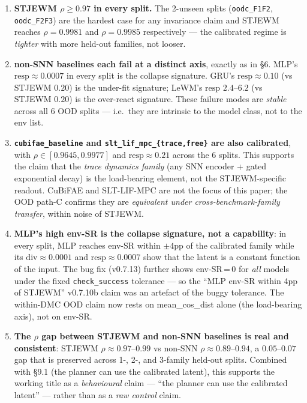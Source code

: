 \documentclass{article}
\begin{document}
\begin{enumerate}
\item \textbf{STJEWM $\rho \geq 0.97$ in every split.} The 2-unseen
splits (\texttt{oodc\_F1F2}, \texttt{oodc\_F2F3}) are the hardest case
for any invariance claim and STJEWM reaches $\rho = 0.9981$ and
$\rho = 0.9985$ respectively --- the calibrated regime is
\emph{tighter} with more held-out families, not looser.

\item \textbf{non-SNN baselines each fail at a distinct axis}, exactly
as in §6. MLP's $\mathrm{resp} \approx 0.0007$ in every split is the
collapse signature. GRU's $\mathrm{resp} \approx 0.10$ (vs STJEWM
$0.20$) is the under-fit signature; LeWM's $\mathrm{resp}$
$2.4$--$6.2$ (vs STJEWM $0.20$) is the over-react signature. These
failure modes are \emph{stable} across all 6 OOD splits --- i.e.\ they
are intrinsic to the model class, not to the env list.

\item \textbf{\texttt{cubifae\_baseline} and
\texttt{slt\_lif\_mpc\_\{trace,free\}} are also calibrated}, with
$\rho \in [0.9645, 0.9977]$ and $\mathrm{resp} \approx 0.21$ across
the 6 splits. This supports the claim that the \emph{trace dynamics
family} (any SNN encoder + gated exponential decay) is the
load-bearing element, not the STJEWM-specific readout. CuBiFAE and
SLT-LIF-MPC are not the focus of this paper; the OOD path-C confirms
they are \emph{equivalent under cross-benchmark-family transfer},
within noise of STJEWM.

\item \textbf{MLP's high env-SR is the collapse signature, not a
capability}: in every split, MLP reaches env-SR within $\pm 4$pp of the
calibrated family while its $\mathrm{div} \approx 0.0001$ and
$\mathrm{resp} \approx 0.0007$ show that the latent is a constant
function of the input. The bug fix (v0.7.13) further shows env-SR\,=\,0
for \emph{all} models under the fixed \texttt{check\_success} tolerance --- so the
``MLP env-SR within 4pp of STJEWM'' v0.7.10b claim was an artefact of
the buggy tolerance. The within-DMC OOD claim now rests on
mean\_cos\_dist alone (the load-bearing axis), not on env-SR.

\item \textbf{The $\rho$ gap between STJEWM and non-SNN baselines is
real and consistent}: STJEWM $\rho \approx 0.97$--$0.99$ vs non-SNN
$\rho \approx 0.89$--$0.94$, a $0.05$--$0.07$ gap that is preserved
across 1-, 2-, and 3-family held-out splits. Combined with §9.1 (the
planner can use the calibrated latent), this supports the working
title as a \emph{behavioural} claim --- ``the planner can use the
calibrated latent'' --- rather than as a \emph{raw control} claim.
\end{enumerate}
\end{document}
